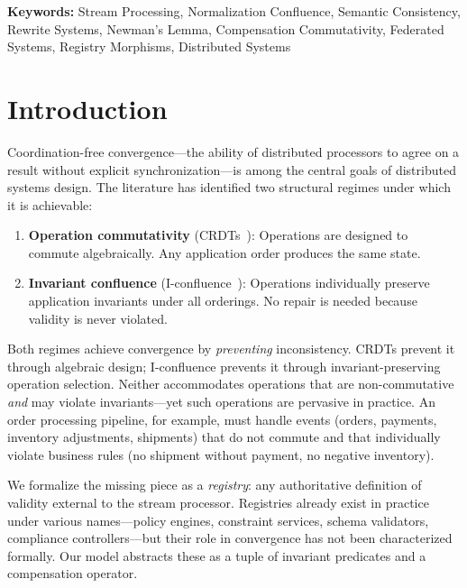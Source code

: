 \documentclass[11pt,a4paper]{article}
\theoremstyle{plain}
\theoremstyle{definition}
\theoremstyle{remark}
\renewcommand{\_}{\textunderscore\allowbreak}
\begin{document}
\medskip\noindent\textbf{Keywords:} Stream Processing, Normalization
Confluence, Semantic Consistency, Rewrite Systems, Newman's Lemma,
Compensation Commutativity, Federated Systems, Registry Morphisms,
Distributed Systems

\clearpage

\section{Introduction}
\label{sec:intro}

Coordination-free convergence---the ability of distributed processors to agree
on a result without explicit synchronization---is among the central goals of
distributed systems design.  The literature has identified two structural
regimes under which it is achievable:

\begin{enumerate}[leftmargin=*,nosep]
\item \textbf{Operation commutativity} (CRDTs~\cite{shapiro2011crdt}):
  Operations are designed to commute algebraically.  Any application order
  produces the same state.
\item \textbf{Invariant confluence}
  (I-confluence~\cite{bailis2014coordination}): Operations individually
  preserve application invariants under all orderings.  No repair is needed
  because validity is never violated.
\end{enumerate}

Both regimes achieve convergence by \emph{preventing} inconsistency.  CRDTs
prevent it through algebraic design; I-confluence prevents it through
invariant-preserving operation selection.  Neither accommodates operations that
are non-commutative \emph{and} may violate invariants---yet such operations
are pervasive in practice.  An order processing pipeline, for example, must
handle events (orders, payments, inventory adjustments, shipments) that do not
commute and that individually violate business rules (no shipment without
payment, no negative inventory).

We formalize the missing piece as a \emph{registry}: any authoritative
definition of validity external to the stream processor.  Registries already
exist in practice under various names---policy engines, constraint services,
schema validators, compliance controllers---but their role in convergence has
not been characterized formally.  Our model abstracts these as a tuple of
invariant predicates and a compensation operator.
\end{document}
